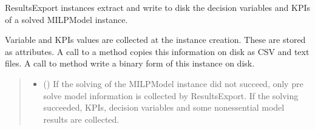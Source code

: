 \documentclass[letterpaper,10pt,english]{sphinxmanual}
\begin{document}
\begin{fulllineitems}
\label{\detokenize{generated/tamos.data_IO.ResultsExport:tamos.data_IO.ResultsExport}}
\pysigstartsignatures
{}
\pysigstopsignatures{}

\begin{fulllineitems}
\label{\detokenize{generated/tamos.data_IO.ResultsExport:tamos.data_IO.ResultsExport.__init__}}
\pysigstartsignatures
{}
\pysigstopsignatures
\sphinxAtStartPar
ResultsExport instances extract and write to disk the decision variables and KPIs of a solved MILPModel instance.

\sphinxAtStartPar
Variable and KPIs values are collected at the instance creation. These are stored as attributes.
A call to a  method copies this information on disk as CSV and text files.
A call to  method write a binary form of this instance on disk.
\begin{quote}\begin{description}
\begin{itemize}
\item {} 
\sphinxAtStartPar
{} ({\hyperref[\detokenize{generated/tamos.MILPModel:tamos.MILPModel}]{}}) \textendash{} If the solving of the MILPModel instance did not succeed, only pre solve model information is collected by ResultsExport.
If the solving succeeded, KPIs, decision variables and some non\sphinxhyphen{}essential model results are collected.


\end{itemize}
\end{description}
\end{quote}
\end{fulllineitems}
\end{fulllineitems}
\end{document}
